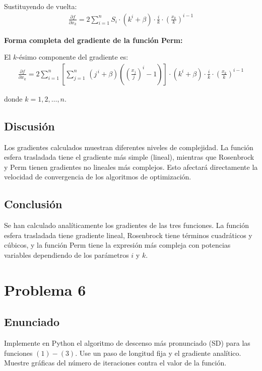 \documentclass{article}
\begin{document}
Sustituyendo de vuelta:
\begin{align}
\frac{\partial f}{\partial x_k} = 2\sum_{i=1}^{n} S_i \cdot (k^i + \beta) \cdot \frac{i}{k} \cdot \left(\frac{x_k}{k}\right)^{i-1}
\end{align}

\textbf{Forma completa del gradiente de la función Perm:}

El $k$-ésimo componente del gradiente es:
\begin{align}
\frac{\partial f}{\partial x_k} = 2\sum_{i=1}^{n} \left[ \sum_{j=1}^{n}\,(j^{\,i} + \beta)\left( \left(\frac{x_j}{j}\right)^{i} - 1 \right) \right] \cdot (k^i + \beta) \cdot \frac{i}{k} \cdot \left(\frac{x_k}{k}\right)^{i-1}
\end{align}

donde $k = 1, 2, \ldots, n$.

\subsection{Discusión}

Los gradientes calculados muestran diferentes niveles de complejidad. La función esfera trasladada tiene el gradiente más simple (lineal), mientras que Rosenbrock y Perm tienen gradientes no lineales más complejos. Esto afectará directamente la velocidad de convergencia de los algoritmos de optimización.

\subsection{Conclusión}

Se han calculado analíticamente los gradientes de las tres funciones. La función esfera trasladada tiene gradiente lineal, Rosenbrock tiene términos cuadráticos y cúbicos, y la función Perm tiene la expresión más compleja con potencias variables dependiendo de los parámetros $i$ y $k$.

\section{Problema 6}

\subsection{Enunciado}
Implemente en Python el algoritmo de descenso más pronunciado (SD) para las funciones $ (1)-(3) $. Use un paso de longitud fija y el gradiente analítico. Muestre gráficas del número de iteraciones contra el valor de la función.
\end{document}
